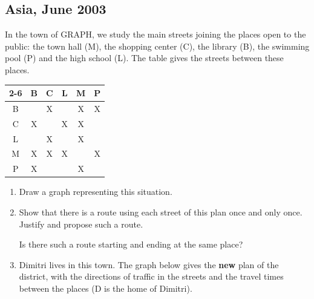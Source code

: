 \newpage
\subsection{Asia, June 2003}\label{asj03}
\begin{minipage}[t]{0.58\textwidth}
In the town of GRAPH, we study the main streets joining the places open to
the public: the town hall (M), the shopping center (C), the library (B), the
swimming pool (P) and the high school (L). The table gives the streets
between these places.
\end{minipage}\hfill
\begin{minipage}[t]{0.38\textwidth}
\begin{center}
\begin{tabular}{|*{5}{c|} c|} \cline{2-6}
\multicolumn{1}{c|}{} & B & C & L & M & P \\ \hline
B &   & X &   & X & X \\ \hline
C & X &   & X & X &   \\ \hline
L &   & X &   & X &   \\ \hline
M & X & X & X &   & X \\ \hline
P & X &   &   & X &   \\ \hline
\end{tabular}
\end{center}
\end{minipage}

\begin{enumerate}
\item Draw a graph representing this situation.
\item Show that there is a route using each street of this plan once and
      only once. Justify and propose such a route.

      Is there such a route starting and ending at the same place?
\item Dimitri lives in this town. The graph below gives the \textbf{new}
      plan of the district, with the directions of traffic in the streets and
      the travel times between the places (D is the home of Dimitri).
\end{enumerate}

\begin{center}
\end{center}

